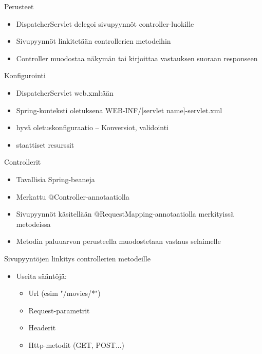\documentclass[hyperref={pdfauthor=\AUTHOR},14pt]{beamer}
\author{\AUTHOR}
\title[\TITLE]{\TITLE}
\date{\DATE}
\begin{document}
\begin{frame}[plain]
\titlepage
\end{frame}

\begin{frame}[t, fragile]{Perusteet}
\begin{itemize}
\item DispatcherServlet delegoi sivupyynnöt controller-luokille
\item Sivupyynnöt linkitetään controllerien metodeihin
\item Controller muodostaa näkymän tai kirjoittaa vastauksen suoraan responseen
\end{itemize}
\end{frame}

\begin{frame}[t, fragile]{Konfigurointi}
\begin{itemize}
\item DispatcherServlet web.xml:ään
\item Spring-konteksti oletuksena WEB-INF/[servlet name]-servlet.xml
\item <mvc:annotationDriven> hyvä oletuskonfiguraatio
-- Konversiot, validointi
\item <mvc:resources> staattiset resurssit
\end{itemize}
\end{frame}

\begin{frame}[t, fragile]{Controllerit}
\begin{itemize}
\item Tavallisia Spring-beaneja
\item Merkattu @Controller-annotaatiolla
\item Sivupyynnöt käsitellään @RequestMapping-annotaatiolla merkityissä metodeissa
\item Metodin paluuarvon perusteella muodostetaan vastaus selaimelle
\end{itemize}
\end{frame}
\begin{frame}[t, fragile]{Sivupyyntöjen linkitys controllerien metodeille}
\begin{itemize}
\item@RequestMapping-annotaatiolla luokka- ja metodi-tasolla
\item Useita sääntöjä:
\begin{itemize}
\item Url (esim "/movies/*")
\item Request-parametrit
\item Headerit
\item Http-metodit (GET, POST...)
\end{itemize}
\end{itemize}
\end{frame}
\end{document}
